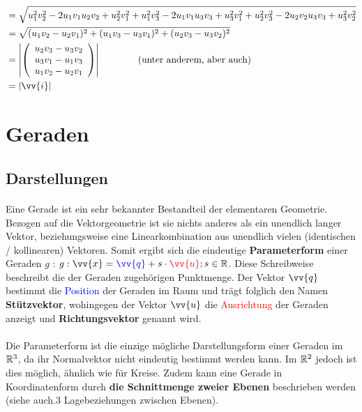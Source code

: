 \documentclass[main.tex]{subfiles}
\begin{document}
\begin{Beweis}
\begin{align*}
                                                        &= \sqrt{u_1^2v_2^2 - 2u_1v_1u_2v_2 + u_2^2v_1^2 + u_1^2v_3^2 - 2u_1v_1u_3v_3 + u_3^2v_1^2 + u_2^2v_3^2 - 2u_2v_2u_3v_3 + u_3^2v_2^2} \\
                                                        &= \sqrt{(u_1v_2 - u_2v_1)^2 + (u_1v_3 - u_3v_1)^2 + (u_2v_3 - u_3v_2)^2} \\
                                                        &= \left|\left(\begin{array}{c} u_2v_3 - u_3v_2 \\ u_3v_1 - u_1v_3 \\ u_1v_2 - u_2v_1 \end{array}\right)\right| \qquad \qquad \text{(unter anderem, aber auch)} \\
                                                        &= |\vv{i}|
        \end{align*}
    \end{Beweis}


\section{Geraden}

    \subsection{Darstellungen}

        \paragraph{} Eine Gerade ist ein sehr bekannter Bestandteil der elementaren Geometrie. Bezogen auf die Vektorgeometrie ist sie nichts anderes als ein
        unendlich langer Vektor, beziehungsweise eine Linearkombination aus unendlich vielen (identischen / kollinearen) Vektoren. Somit ergibt sich die
        eindeutige \textbf{Parameterform} einer Geraden $g$ : \quad$g:\vv{x}=\textcolor{blue}{\vv{q}}+s\cdot\textcolor{red}{\vv{u}};s\in\R$. Diese Schreibweise
        beschreibt die der Geraden zugehörigen Punktmenge. Der Vektor $\vv{q}$ bestimmt die \textcolor{blue}{Position} der Geraden im Raum und trägt folglich
        den Namen \textbf{Stützvektor}, wohingegen der Vektor $\vv{u}$ die \textcolor{red}{Ausrichtung} der Geraden anzeigt und \textbf{Richtungsvektor} genannt
        wird.
        \\
        \begin{Bemerkung}
            \paragraph{} Die Parameterform ist die einzige mögliche Darstellungsform einer Geraden im $\mathbb{R}^3$, da ihr Normalvektor nicht eindeutig bestimmt
            werden kann. Im $\mathbb{R}^2$ jedoch ist dies möglich, ähnlich wie für Kreise. Zudem kann eine Gerade in Koordinatenform durch \textbf{die
            Schnittmenge zweier Ebenen} beschrieben werden (siehe auch.3 Lagebeziehungen zwischen Ebenen\grqq).
        \end{Bemerkung}
\end{document}
